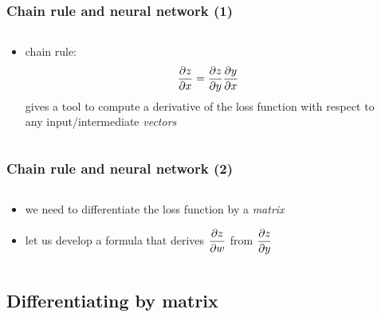 \documentclass[12pt,dvipdfmx]{beamer}
\newcommand{\ao}[1]{{\color{blue}#1}}
\begin{document}
\begin{frame}
\frametitle{Chain rule and neural network (1)}
\begin{columns}
\begin{column}{0.6\textwidth}
\begin{itemize}
\item chain rule:
\[ \frac{\partial z}{\partial x} = \frac{\partial z}{\partial y} \frac{\partial y}{\partial x} \]
gives a tool to compute a derivative of
the loss function with respect to any 
input/intermediate \ao{\emph{vectors}}


\end{itemize}
\end{column}

\begin{column}{0.4\textwidth}
\begin{center}
\def\svgheight{\textheight}
{\scriptsize}
\end{center}
\end{column}  
\end{columns}
\end{frame}

\begin{frame}
\frametitle{Chain rule and neural network (2)}
\begin{columns}
\begin{column}{0.6\textwidth}
\begin{itemize}
\item we need to differentiate the loss function by a \ao{\emph{matrix}}
\item let us develop a formula that derives ${\displaystyle\frac{\partial z}{\partial w}}$ 
from ${\displaystyle\frac{\partial z}{\partial y}}$
\end{itemize}
\end{column}

\begin{column}{0.4\textwidth}
\begin{center}
\def\svgheight{\textheight}
{\scriptsize}
\end{center}
\end{column}  
\end{columns}
\end{frame}

\subsection{Differentiating by matrix}
\end{document}
